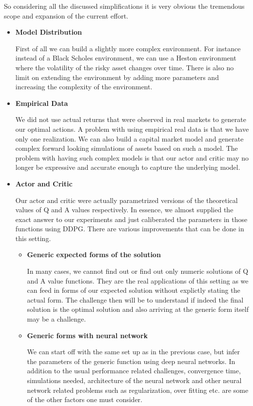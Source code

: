 So considering all the discussed simplifications it is very obvious the tremendous scope and expansion of the current effort.
\begin{itemize}
    \item \textbf{Model Distribution}
    
    First of all we can build a slightly more complex environment. For instance instead of a Black Scholes environment, we can use a Heston environment \cite{Heston1993} where the volatility of the risky asset changes over time. There is also no limit on extending the environment by adding more parameters and increasing the complexity of the environment.
    \item \textbf{Empirical Data}
    
    We did not use actual returns that were observed in real markets to generate our optimal actions. A problem with using empirical real data is that we have only one realization. We can also build a capital market model and generate complex forward looking simulations of assets based on such a model. The problem with having such complex models is that our actor and critic may no longer be expressive and accurate enough to capture the underlying model.
    
    \item \textbf{Actor and Critic }

    Our actor and critic were actually parametrized versions of the theoretical values of Q and A values respectively. In essence, we almost supplied the exact answer to our experiments and just caliberated the parameters in those functions using DDPG. There are various improvements that can be done in this setting.
    \begin{itemize}
        \item \textbf{Generic expected forms of the solution}

        In many cases, we cannot find out or find out only numeric solutions of Q and A value functions. They are the real applications of this setting as we can feed in forms of our expected solution without explictly stating the actual form. The challenge then will be to understand if indeed the final solution is the optimal solution and also arriving at the generic form itself may be a challenge.

        \item \textbf{Generic forms with neural network}

        We can start off with the same set up as in the previous case, but infer the parameters of the generic function using deep neural networks. In addition to the usual performance related challenges,  convergence time, simulations needed, architecture of the neural network and other neural network related problems such as regularization, over fitting etc. are some of the other factors one must consider.


\end{itemize}
\end{itemize}
